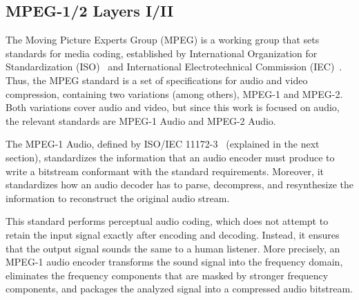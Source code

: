  

\subsection{MPEG-1/2 Layers I/II}

The Moving Picture Experts Group (MPEG) is a working group that sets standards for media coding, established by International Organization for Standardization (ISO)~\cite{iso} and International Electrotechnical Commission (IEC)~\cite{iec}. Thus, the MPEG standard is a set of specifications for audio and video compression, containing two variations (among others), MPEG-1 and MPEG-2. Both variations cover audio and video, but since this work is focused on audio, the relevant standards are MPEG-1 Audio and MPEG-2 Audio.

The MPEG-1 Audio, defined by ISO/IEC 11172-3~\cite{11172} (explained in the next section), standardizes the information that an audio encoder must produce to write a bitstream conformant with the standard requirements. Moreover, it standardizes how an audio decoder has to parse, decompress, and resynthesize the information to reconstruct the original audio stream.

This standard performs perceptual audio coding, which does not attempt to retain the input signal exactly after encoding and decoding. Instead, it ensures that the output signal sounds the same to a human listener. %
More precisely, an MPEG-1 audio encoder transforms the sound signal into the frequency domain, eliminates the frequency components that are masked by stronger frequency components, and packages the analyzed signal into a compressed audio bitstream.

